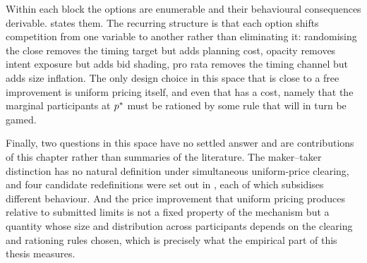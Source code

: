Within each block the options are enumerable and their behavioural
consequences derivable.  states them. The recurring
structure is that each option shifts competition from one variable to
another rather than eliminating it: randomising the close removes the
timing target but adds planning cost, opacity removes intent exposure
but adds bid shading, pro rata removes the timing channel but adds size
inflation. The only design choice in this space that is close to a free
improvement is uniform pricing itself, and even that has a cost, namely
that the marginal participants at $p^{\ast}$ must be rationed by some rule
that will in turn be gamed.

Finally, two questions in this space have no settled answer and are
contributions of this chapter rather than summaries of the literature.
The maker--taker distinction has no natural definition under
simultaneous uniform-price clearing, and four candidate redefinitions
were set out in , each of which subsidises
different behaviour. And the price improvement that uniform pricing
produces relative to submitted limits is not a fixed property of the
mechanism but a quantity whose size and distribution across participants
depends on the clearing and rationing rules chosen, which is precisely
what the empirical part of this thesis measures.
